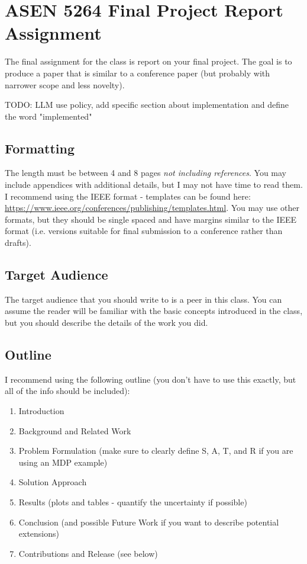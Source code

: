 \documentclass{article}
\begin{document}
\section*{ASEN 5264 Final Project Report Assignment}

The final assignment for the class is report on your final project. The goal is to produce a paper that is similar to a conference paper (but probably with narrower scope and less novelty).

TODO: LLM use policy, add specific section about implementation and define the word "implemented"

\subsection*{Formatting}

The length must be between 4 and 8 pages \emph{not including references}. You may include appendices with additional details, but I may not have time to read them. I recommend using the IEEE format - templates can be found here: \url{https://www.ieee.org/conferences/publishing/templates.html}. You may use other formats, but they should be single spaced and have margins similar to the IEEE format (i.e. versions suitable for final submission to a conference rather than drafts).

\subsection*{Target Audience}

The target audience that you should write to is a peer in this class. You can assume the reader will be familiar with the basic concepts introduced in the class, but you should describe the details of the work you did.

\subsection*{Outline}

I recommend using the following outline (you don't have to use this exactly, but all of the info should be included):

\begin{enumerate}[nosep]
    \item Introduction
    \item Background and Related Work
    \item Problem Formulation (make sure to clearly define S, A, T, and R if you are using an MDP example)
    \item Solution Approach
    \item Results (plots and tables - quantify the uncertainty if possible)
    \item Conclusion (and possible Future Work if you want to describe potential extensions)
    \item Contributions and Release (see below)
\end{enumerate}
\end{document}

